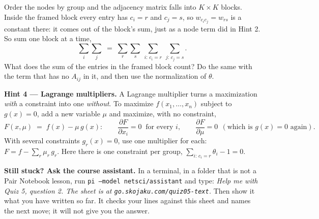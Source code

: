 \documentclass[a4paper, 11pt]{extarticle}
\begin{document}
Order the nodes by group and the adjacency matrix falls into $K \times K$
blocks. Inside the framed block every entry has $c_i = r$ and $c_j = s$, so
$w_{c_ic_j} = w_{rs}$ is a constant there: it comes out of the block's sum,
just as a node term did in Hint 2. So sum one block at a time,
\[
  \sum_i \sum_j \;=\; \sum_r \sum_s \ \sum_{i:\,c_i = r} \ \sum_{j:\,c_j = s} .
\]
What does the sum of the entries in the framed block count? Do the same with
the term that has no $A_{ij}$ in it, and then use the normalization of
$\theta$.

\vspace{0.4em}

\textbf{Hint 4 --- Lagrange multipliers.}
A Lagrange multiplier turns a maximization \emph{with} a constraint into one
\emph{without}. To maximize $f(x_1, \dots, x_n)$ subject to $g(x) = 0$, add a
new variable $\mu$ and maximize, with no constraint,
\[
  F(x, \mu) \;=\; f(x) - \mu\, g(x) :
  \qquad
  \frac{\partial F}{\partial x_i} = 0 \ \text{ for every } i,
  \qquad
  \frac{\partial F}{\partial \mu} = 0 \ \ (\text{which is } g(x) = 0 \text{ again}).
\]
With several constraints $g_r(x) = 0$, use one multiplier for each:
$F = f - \sum_r \mu_r\, g_r$. Here there is one constraint per group,
$\sum_{i:\,c_i = r} \theta_i - 1 = 0$.

\vfill

\begin{tcolorbox}[colback=white, colframe=rulegrey, boxrule=0.5pt,
                  sharp corners, boxsep=2pt, left=6pt, right=6pt,
                  top=4pt, bottom=4pt]
\textbf{Still stuck? Ask the course assistant.} In a terminal, in a folder
that is not a Pair Notebook lesson, run \texttt{pi --model netsci/assistant}
and type: \emph{Help me with Quiz 5, question 2. The sheet is at
\texttt{go.skojaku.com/quiz05-text}.} Then show it what you have written so
far. It checks your lines against this sheet and names the next move; it will
not give you the answer.
\end{tcolorbox}
\end{document}
